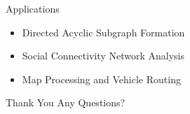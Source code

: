 \documentclass{beamer}
\begin{document}
\begin{frame}{Applications}
    
    \begin{itemize}
        \item <1-> Directed Acyclic Subgraph Formation
        \item <2-> Social Connectivity Network Analysis
        \item <3-> Map Processing and Vehicle Routing
    \end{itemize}
    
\end{frame}

\appendix

\begin{frame}{Thank You}
\centering
    \large{Any Questions?}
\end{frame}
\end{document}
